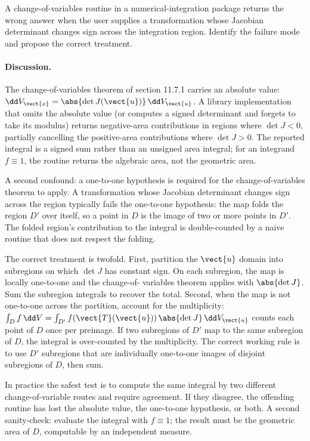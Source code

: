 \begin{exercise}
A change-of-variables routine in a numerical-integration package
returns the wrong answer when the user supplies a transformation
whose Jacobian determinant changes sign across the integration
region. Identify the failure mode and propose the correct treatment.

\paragraph{Discussion.} The change-of-variables theorem of section
11.7.1 carries an absolute value: $\dd V_{\vect{x}} = \abs{\det
J(\vect{u})}\,\dd V_{\vect{u}}$. A library implementation that
omits the absolute value (or computes a signed determinant and
forgets to take its modulus) returns negative-area contributions in
regions where $\det J < 0$, partially cancelling the positive-area
contributions where $\det J > 0$. The reported integral is a signed
sum rather than an unsigned area integral; for an integrand
$f \equiv 1$, the routine returns the algebraic area, not the
geometric area.

A second confound: a one-to-one hypothesis is required for the
change-of-variables theorem to apply. A transformation whose
Jacobian determinant changes sign across the region typically fails
the one-to-one hypothesis: the map folds the region $D'$ over
itself, so a point in $D$ is the image of two or more points in
$D'$. The folded region's contribution to the integral is
double-counted by a naive routine that does not respect the folding.

The correct treatment is twofold. First, partition the $\vect{u}$
domain into subregions on which $\det J$ has constant sign. On each
subregion, the map is locally one-to-one and the change-of-
variables theorem applies with $\abs{\det J}$. Sum the subregion
integrals to recover the total. Second, when the map is not
one-to-one across the partition, account for the multiplicity:
$\int_{D} f\,\dd V = \int_{D'} f(\vect{T}(\vect{u}))\,\abs{\det J}\,
\dd V_{\vect{u}}$ counts each point of $D$ once per preimage. If
two subregions of $D'$ map to the same subregion of $D$, the
integral is over-counted by the multiplicity. The correct working
rule is to use $D'$ subregions that are individually one-to-one
images of disjoint subregions of $D$, then sum.

In practice the safest test is to compute the same integral by two
different change-of-variable routes and require agreement. If they
disagree, the offending routine has lost the absolute value, the
one-to-one hypothesis, or both. A second sanity-check: evaluate the
integral with $f \equiv 1$; the result must be the geometric area
of $D$, computable by an independent measure.
\end{exercise}

